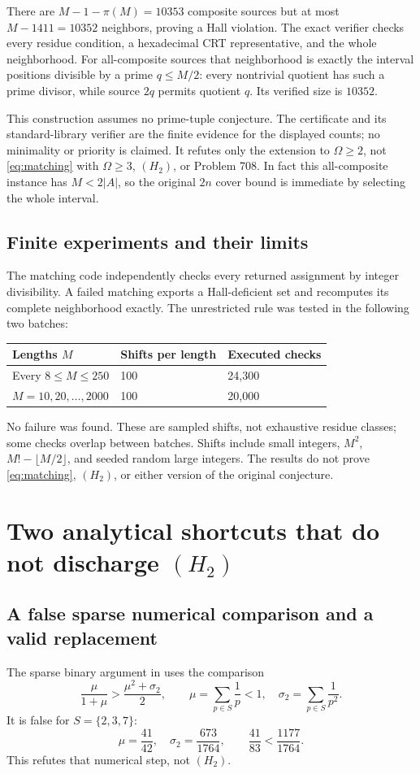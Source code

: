 \documentclass[11pt,a4paper]{article}
\theoremstyle{remark}
\begin{document}
There are $M-1-\pi(M)=10353$ composite sources but at most
$M-1411=10352$ neighbors, proving a Hall violation. The exact verifier
checks every residue condition, a hexadecimal CRT representative, and
the whole neighborhood. For all-composite sources that neighborhood is
exactly the interval positions divisible by a prime $q\le M/2$:
every nontrivial quotient has such a prime divisor, while source $2q$
permits quotient $q$. Its verified size is $10352$.

This construction assumes no prime-tuple conjecture. The certificate
and its standard-library verifier are the finite evidence for the
displayed counts; no minimality or priority is claimed. It refutes only
the extension to $\Omega\ge2$, not \eqref{eq:matching} with
$\Omega\ge3$, $(H_2)$, or Problem 708. In fact this all-composite
instance has $M<2|A|$, so the original $2n$ cover bound is immediate by
selecting the whole interval.

\subsection{Finite experiments and their limits}
The matching code independently checks every returned assignment by
integer divisibility. A failed matching exports a Hall-deficient set
and recomputes its complete neighborhood exactly.
The unrestricted rule was tested in the following two batches:
\begin{center}
\begin{tabular}{@{}lll@{}}\toprule
Lengths $M$ & Shifts per length & Executed checks\\\midrule
Every $8\le M\le250$ & 100 & 24,300\\
$M=10,20,\ldots,2000$ & 100 & 20,000\\\bottomrule
\end{tabular}
\end{center}
No failure was found. These are sampled shifts, not exhaustive residue
classes; some checks overlap between batches. Shifts include small
integers, $M^2$, $M!-\lfloor M/2\rfloor$, and seeded random large
integers. The results do not prove \eqref{eq:matching}, $(H_2)$, or either
version of the original conjecture.

\section{Two analytical shortcuts that do not discharge \texorpdfstring{$(H_2)$}{(H2)}}
\subsection{A false sparse numerical comparison and a valid replacement}
The sparse binary argument in \cite{berg-hinge} uses the comparison
\[
 \frac{\mu}{1+\mu}>\frac{\mu^2+\sigma_2}{2},
 \qquad \mu=\sum_{p\in S}\frac1p<1,
 \quad \sigma_2=\sum_{p\in S}\frac1{p^2}.
\]
It is false for $S=\{2,3,7\}$:
\[
 \mu=\frac{41}{42},\quad \sigma_2=\frac{673}{1764},\qquad
 \frac{41}{83}<\frac{1177}{1764}.
\]
This refutes that numerical step, not $(H_2)$.
\end{document}
